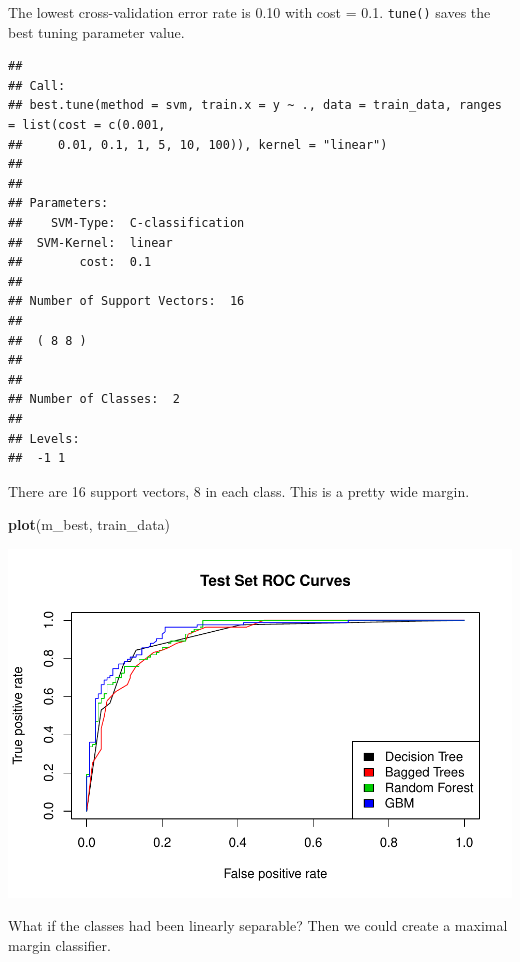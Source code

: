 \documentclass[
]{book}
\newenvironment{Shaded}{\begin{snugshade}}{\end{snugshade}}
\newcommand{\KeywordTok}[1]{\textcolor[rgb]{0.13,0.29,0.53}{\textbf{#1}}}
\newcommand{\NormalTok}[1]{#1}
\newcommand{\OperatorTok}[1]{\textcolor[rgb]{0.81,0.36,0.00}{\textbf{#1}}}
\newcommand{\StringTok}[1]{\textcolor[rgb]{0.31,0.60,0.02}{#1}}
\begin{document}
The lowest cross-validation error rate is 0.10 with cost = 0.1. \texttt{tune()} saves the best tuning parameter value.

\begin{Shaded}
\end{Shaded}

\begin{verbatim}
## 
## Call:
## best.tune(method = svm, train.x = y ~ ., data = train_data, ranges = list(cost = c(0.001, 
##     0.01, 0.1, 1, 5, 10, 100)), kernel = "linear")
## 
## 
## Parameters:
##    SVM-Type:  C-classification 
##  SVM-Kernel:  linear 
##        cost:  0.1 
## 
## Number of Support Vectors:  16
## 
##  ( 8 8 )
## 
## 
## Number of Classes:  2 
## 
## Levels: 
##  -1 1
\end{verbatim}

There are 16 support vectors, 8 in each class. This is a pretty wide margin.

\begin{Shaded}
\begin{Highlighting}[]
\KeywordTok{plot}\NormalTok{(m_best, train_data)}
\end{Highlighting}
\end{Shaded}

\includegraphics{data-sci_files/figure-latex/unnamed-chunk-124-1.pdf}

What if the classes had been linearly separable? Then we could create a maximal margin classifier.
\end{document}
